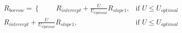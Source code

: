 \documentclass[preview]{standalone}
\begin{document}
\begin{align*}
R_{borrow} = \begin{cases} \\[6pt] & \text{ } \end{cases} R_{intercept} +  \frac{U}{U_{Optimal}} R_{slope1}, & \text{if }  U \leq U_{optimal} \\R_{intercept} +  \frac{U}{U_{Optimal}} R_{slope1}, & \text{if }  U \leq U_{optimal}
\end{align*}
\end{document}
